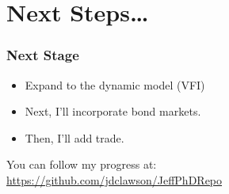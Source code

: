 \documentclass[11pt]{beamer}
\theoremstyle{definition}
\begin{document}
\section{Next Steps\dots} 
\begin{frame}
    \frametitle{Next Stage}
    \begin{itemize}
        \item Expand to the dynamic model (VFI)
        \item Next, I'll incorporate bond markets.
        \item Then, I'll add trade.
    \end{itemize}

    You can follow my progress at: \\

    \url{https://github.com/jdclawson/JeffPhDRepo}


\end{frame}



\end{document}

